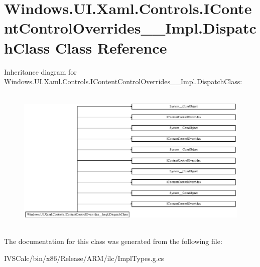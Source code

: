 \hypertarget{class_windows_1_1_u_i_1_1_xaml_1_1_controls_1_1_i_content_control_overrides_____impl_1_1_dispatch_class}{}\section{Windows.\+U\+I.\+Xaml.\+Controls.\+I\+Content\+Control\+Overrides\+\_\+\+\_\+\+Impl.\+Dispatch\+Class Class Reference}
\label{class_windows_1_1_u_i_1_1_xaml_1_1_controls_1_1_i_content_control_overrides_____impl_1_1_dispatch_class}
Inheritance diagram for Windows.\+U\+I.\+Xaml.\+Controls.\+I\+Content\+Control\+Overrides\+\_\+\+\_\+\+Impl.\+Dispatch\+Class\+:\begin{figure}[H]
\begin{center}
\leavevmode
\includegraphics[height=7.064220cm]{class_windows_1_1_u_i_1_1_xaml_1_1_controls_1_1_i_content_control_overrides_____impl_1_1_dispatch_class}
\end{center}
\end{figure}


The documentation for this class was generated from the following file\+:\begin{DoxyCompactItemize}
\item 
I\+V\+S\+Calc/bin/x86/\+Release/\+A\+R\+M/ilc/Impl\+Types.\+g.\+cs\end{DoxyCompactItemize}
